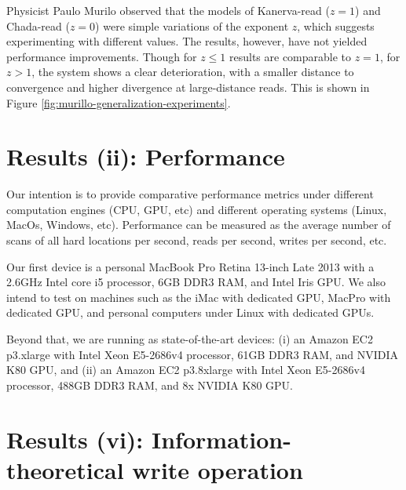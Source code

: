 Physicist Paulo Murilo observed that the models of Kanerva-read ($z=1$) and Chada-read ($z=0$) were simple variations of the exponent $z$, which suggests experimenting with different values. The results, however, have not yielded performance improvements.  Though for $z \leq 1$ results are comparable to $z=1$, for $z>1$, the system shows a clear deterioration, with a smaller distance to convergence and higher divergence at large-distance reads. This is shown in Figure \ref{fig:murillo-generalization-experiments}.



\chapter{Results (ii): Performance}

Our intention is to provide comparative performance metrics under different computation engines (CPU, GPU, etc) and different operating systems (Linux, MacOs, Windows, etc). Performance can be measured as the average number of scans of all hard locations per second, reads per second, writes per second, etc.

Our first device is a personal MacBook Pro Retina 13-inch Late 2013 with a 2.6GHz Intel core i5 processor, 6GB DDR3 RAM, and Intel Iris GPU.  We also intend to test on machines such as the iMac with dedicated GPU, MacPro with dedicated GPU, and personal computers under Linux with dedicated GPUs.

Beyond that, we are running as state-of-the-art devices: (i) an Amazon EC2 p3.xlarge with Intel Xeon E5-2686v4 processor, 61GB DDR3 RAM, and NVIDIA K80 GPU, and (ii) an Amazon EC2 p3.8xlarge with Intel Xeon E5-2686v4 processor, 488GB DDR3 RAM, and 8x NVIDIA K80 GPU.




\chapter{Results (vi): Information-theoretical write operation}


